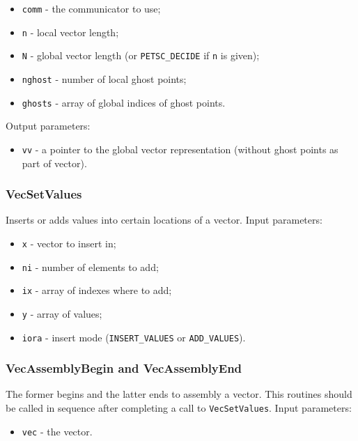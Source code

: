 \begin{itemize}
\item \verb|comm| - the communicator to use;
\item \verb|n| - local vector length;
\item \verb|N| - global vector length (or \verb|PETSC_DECIDE| if \verb|n| is given);
\item \verb|nghost| - number of local ghost points;
\item \verb|ghosts| - array of global indices of ghost points.
\end{itemize}

Output parameters:

\begin{itemize}
\item \verb|vv| - a pointer to the global vector representation (without ghost points as part of vector).
\end{itemize}

\subsubsection{VecSetValues}\label{subsubsection:VecSetValues}
Inserts or adds values into certain locations of a vector. Input parameters:

\begin{itemize}
\item \verb|x| - vector to insert in;
\item \verb|ni| - number of elements to add;
\item \verb|ix| - array of indexes where to add;
\item \verb|y| - array of values;
\item \verb|iora| - insert mode (\verb|INSERT_VALUES| or \verb|ADD_VALUES|).
\end{itemize}

\subsubsection{VecAssemblyBegin and VecAssemblyEnd}\label{subsubsection:VecAssembly}
The former begins and the latter ends to assembly a vector. This routines should be called in sequence after completing a call to \verb|VecSetValues|. Input parameters:

\begin{itemize}
\item \verb|vec| - the vector.
\end{itemize}

